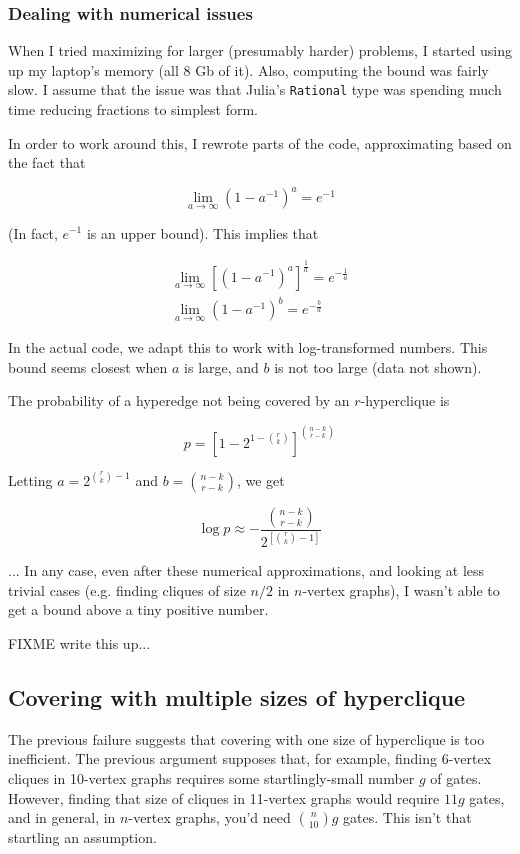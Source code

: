 \documentclass[12pt]{article}
\theoremstyle{definition}
\begin{document}
\subsubsection{Dealing with numerical issues}

When I tried maximizing for larger (presumably harder)
problems, I started using up my laptop's
memory (all 8 Gb of it). Also, computing the bound
was fairly slow. I assume that the
issue was that Julia's {\tt Rational} type was spending much time reducing
fractions to simplest form.

In order to work around this, I rewrote parts of the code,
approximating based on the fact that

\[
\lim_{a\to\infty} (1 - a^{-1})^{a} = e^{-1}
\]

(In fact, $e^{-1}$ is an upper bound). This implies that

\begin{eqnarray*}
\lim_{a\to\infty} [(1 - a^{-1})^{a}]^\frac{1}{a} = e^{-\frac{1}{a}} \\
\lim_{a\to\infty} (1 - a^{-1})^{b} = e^{-\frac{b}{a}}
\end{eqnarray*}

In the actual code, we adapt this to work with log-transformed numbers.
This bound seems closest when $a$ is large, and $b$ is not too large
(data not shown).

The probability of a hyperedge not being covered by an $r$-hyperclique is

\[
p = [1 - 2 ^ {1-{r \choose k}}] ^ {n-k \choose r-k}
\]

Letting $a = 2^{{r \choose k}-1}$ and $b = {n-k \choose r-k}$, we get

\[
\log p \approx - \frac{{n-k \choose r-k}} {2^{[{r \choose k}-1]}}
\]


... In any case, even after these numerical approximations, and
looking at less trivial cases (e.g. finding cliques of size $n/2$ in
$n$-vertex graphs), I wasn't able to get a bound above a tiny
positive number.

FIXME write this up...

\subsection{Covering with multiple sizes of hyperclique}

The previous failure suggests that covering
with one size of hyperclique is too inefficient. The previous
argument supposes that, for example, finding 6-vertex cliques
in 10-vertex graphs requires some startlingly-small number $g$ of
gates. However, finding that size of cliques in 11-vertex graphs
would require $11g$ gates, and in general, in $n$-vertex graphs,
you'd need ${n \choose 10}g$ gates.
This isn't that startling an assumption.
\end{document}
